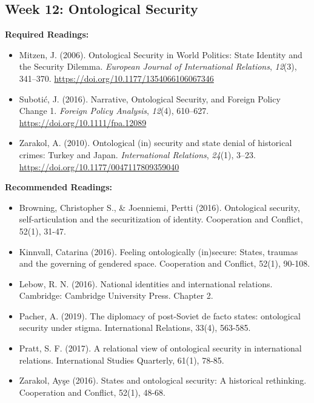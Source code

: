 \documentclass[
  letterpaper,
  DIV=11,
  numbers=noendperiod]{scrartcl}
\providecommand{\tightlist}{%
  \setlength{\itemsep}{0pt}\setlength{\parskip}{0pt}}\usepackage{longtable,booktabs,array}
\begin{document}
\hypertarget{week-12-ontological-security}{%
\subsection*{Week 12: Ontological
Security}\label{week-12-ontological-security}}

\textbf{Required Readings:}

\begin{itemize}
\tightlist
\item
  Mitzen, J. (2006). Ontological {Security} in {World} {Politics}:
  {State} {Identity} and the {Security} {Dilemma}. \emph{European
  Journal of International Relations}, \emph{12}(3), 341--370.
  \url{https://doi.org/10.1177/1354066106067346}
\item
  Subotić, J. (2016). Narrative, {Ontological} {Security}, and {Foreign}
  {Policy} {Change} 1. \emph{Foreign Policy Analysis}, \emph{12}(4),
  610--627. \url{https://doi.org/10.1111/fpa.12089}
\item
  Zarakol, A. (2010). Ontological (in) security and state denial of
  historical crimes: {Turkey} and {Japan}. \emph{International
  Relations}, \emph{24}(1), 3--23.
  \url{https://doi.org/10.1177/0047117809359040}
\end{itemize}

\textbf{Recommended Readings:}

\begin{itemize}
\tightlist
\item
  Browning, Christopher S., \& Joenniemi, Pertti (2016). Ontological
  security, self-articulation and the securitization of identity.
  Cooperation and Conflict, 52(1), 31-47.
\item
  Kinnvall, Catarina (2016). Feeling ontologically (in)secure: States,
  traumas and the governing of gendered space. Cooperation and Conflict,
  52(1), 90-108.
\item
  Lebow, R. N. (2016). National identities and international relations.
  Cambridge: Cambridge University Press. Chapter 2.
\item
  Pacher, A. (2019). The diplomacy of post-Soviet de facto states:
  ontological security under stigma. International Relations, 33(4),
  563-585.
\item
  Pratt, S. F. (2017). A relational view of ontological security in
  international relations. International Studies Quarterly, 61(1),
  78-85.
\item
  Zarakol, Ayşe (2016). States and ontological security: A historical
  rethinking. Cooperation and Conflict, 52(1), 48-68.
\end{itemize}
\end{document}
